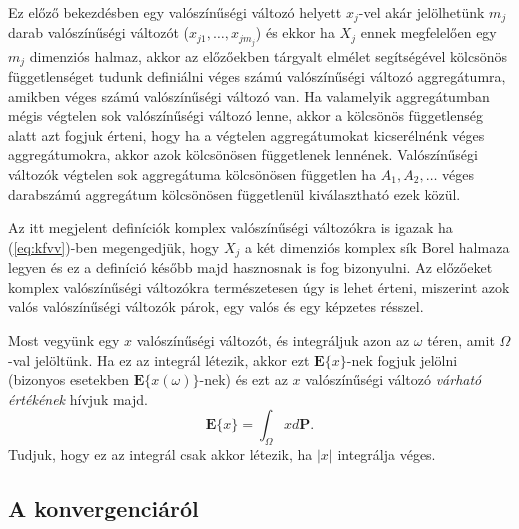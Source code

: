 \documentclass{article}
\begin{document}
Ez előző bekezdésben egy valószínűségi változó helyett $x_j$-vel akár jelölhetünk $m_j$ darab valószínűségi változót ($x_{j1},\ldots,x_{jm_j}$) és ekkor ha $X_j$ ennek megfelelően egy $m_j$ dimenziós halmaz, akkor az előzőekben tárgyalt elmélet segítségével kölcsönös függetlenséget tudunk definiálni véges számú valószínűségi változó aggregátumra, amikben véges számú valószínűségi változó van. Ha valamelyik aggregátumban mégis végtelen sok valószínűségi változó lenne, akkor a kölcsönös függetlenség alatt azt fogjuk érteni, hogy ha a végtelen aggregátumokat kicserélnénk véges aggregátumokra, akkor azok kölcsönösen függetlenek lennének. Valószínűségi változók végtelen sok aggregátuma kölcsönösen független ha $A_1,A_2,\ldots$ véges darabszámú aggregátum kölcsönösen függetlenül kiválasztható ezek közül. 

Az itt megjelent definíciók komplex valószínűségi változókra is igazak ha (\ref{eq:kfvv})-ben megengedjük, hogy $X_j$ a két dimenziós komplex sík Borel halmaza legyen és ez a definíció később majd hasznosnak is fog bizonyulni. Az előzőeket komplex valószínűségi változókra természetesen úgy is lehet érteni, miszerint azok valós valószínűségi változók párok, egy valós és egy képzetes résszel. 

Most vegyünk egy $x$ valószínűségi változót, és integráljuk azon az $\omega$ téren, amit $\Omega$-val jelöltünk. Ha ez az integrál létezik, akkor ezt $\mathrm{\textbf{E}}\{x\}$-nek fogjuk jelölni (bizonyos esetekben $\mathrm{\textbf{E}}\{x(\omega)\}$-nek) és ezt az $x$ valószínűségi változó \textit{várható értékének} hívjuk majd.
\begin{equation}
 \mathrm{\textbf{E}}\{x\} = \int_{\Omega} x d \mathrm{\textbf{P}}.
\end{equation}
Tudjuk, hogy ez az integrál csak akkor létezik, ha $|x|$ integrálja véges. 

\subsection{A konvergenciáról}
\end{document}
